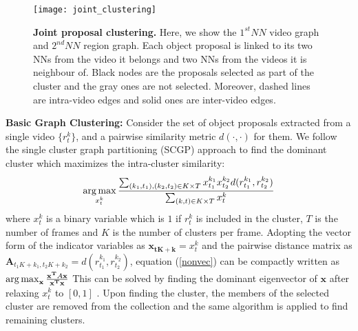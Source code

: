 \begin{figure}[ht]
  \texttt{[image: joint\_clustering]}
\caption{\textbf{Joint proposal clustering.} Here, we show the $1^{st}NN$ video graph and $2^{nd}NN$ region graph. Each object proposal is linked to its two NNs from the video it belongs and two NNs from the videos it is neighbour of. Black nodes are the proposals selected as part of the cluster and the gray ones are not selected. Moreover, dashed lines are intra-video edges and solid ones are inter-video edges.}
  \label{hierProposal}
\end{figure}

\noindent\textbf{Basic Graph Clustering:} Consider the set of object proposals extracted from a single video $\{r^k_t\}$, and a pairwise similarity metric $d(\cdot,\cdot)$ for them. We follow the single cluster graph partitioning (SCGP)\cite{scgp} approach to find the dominant cluster which maximizes the intra-cluster similarity:
\begin{equation}
  \argmax_{x^k_t} \frac{\sum_{(k_1,t_1),(k_2,t_2) \in K \times T} x^{k_1}_{t_1} x^{k_2}_{t_2} d(r^{k_1}_{t_1},r^{k_2}_{t_2})}{\sum_{(k,t) \in K \times T} x^{k}_t}
  \label{nonvec}
\end{equation}
where $x^{k}_t$ is a binary variable which is $1$ if $r^{k}_t$ is included in the cluster, $T$ is the number of frames and $K$ is the number of clusters per frame. Adopting the vector form of the indicator variables as $\mathbf{x_{tK+k}}=x^{k}_{t}$ and the pairwise distance matrix as $\mathbf{A}_{t_1K+k_1,t_2K+k_2}=d(r^{k_1}_{t_1},r^{k_2}_{t_2})$, equation (\ref{nonvec}) can be compactly written as
$\operatorname*{arg\,max}_{\mathbf{x}} \frac{\mathbf{x^T}A\mathbf{x}}{\mathbf{x^T}\mathbf{x}}$
This can be solved by finding the dominant eigenvector of $\mathbf{x}$ after relaxing $x^{k}_t$ to $[0,1]$ \cite{scgp,scgp_eigen}. Upon finding the cluster, the members of the selected cluster are removed from the collection and the same algorithm is applied to find remaining clusters.

